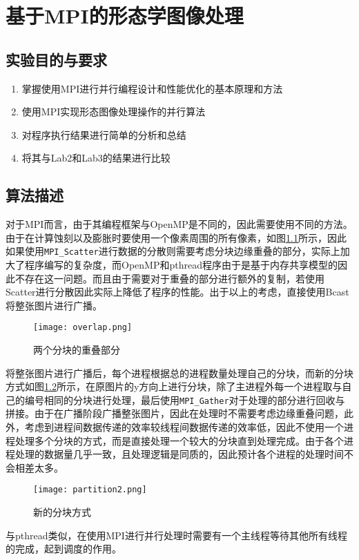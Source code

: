 
\chapter{基于MPI的形态学图像处理}
\section{实验目的与要求}
\begin{enumerate}
    \item 掌握使用MPI进行并行编程设计和性能优化的基本原理和方法
    \item 使用MPI实现形态图像处理操作的并行算法
    \item 对程序执行结果进行简单的分析和总结
    \item 将其与Lab2和Lab3的结果进行比较
\end{enumerate}

\section{算法描述}
\par 对于MPI而言，由于其编程框架与OpenMP是不同的，因此需要使用不同的方法。由于在计算蚀刻以及膨胀时要使用一个像素周围的所有像素，如图\ref{fig:overlap}所示，因此如果使用\lstinline{MPI_Scatter}进行数据的分散则需要考虑分块边缘重叠的部分，实际上加大了程序编写的复杂度，而OpenMP和pthread程序由于是基于内存共享模型的因此不存在这一问题。而且由于需要对于重叠的部分进行额外的复制，若使用Scatter进行分散因此实际上降低了程序的性能。出于以上的考虑，直接使用Bcast将整张图片进行广播。

\begin{figure}[htpb]
    \centering
    \texttt{[image: overlap.png]}
    \caption{两个分块的重叠部分}
    \label{fig:overlap}
\end{figure}

\par 将整张图片进行广播后，每个进程根据总的进程数量处理自己的分块，而新的分块方式如图\ref{fig:partition2}所示，在原图片的y方向上进行分块，除了主进程外每一个进程取与自己的编号相同的分块进行处理，最后使用\lstinline{MPI_Gather}对于处理的部分进行回收与拼接。由于在广播阶段广播整张图片，因此在处理时不需要考虑边缘重叠问题，此外，考虑到进程间数据传递的效率较线程间数据传递的效率低，因此不使用一个进程处理多个分块的方式，而是直接处理一个较大的分块直到处理完成。由于各个进程处理的数据量几乎一致，且处理逻辑是同质的，因此预计各个进程的处理时间不会相差太多。
\begin{figure}[htpb]
    \centering
    \texttt{[image: partition2.png]}
    \caption{新的分块方式}
    \label{fig:partition2}
\end{figure}
\par 与pthread类似，在使用MPI进行并行处理时需要有一个主线程等待其他所有线程的完成，起到调度的作用。

